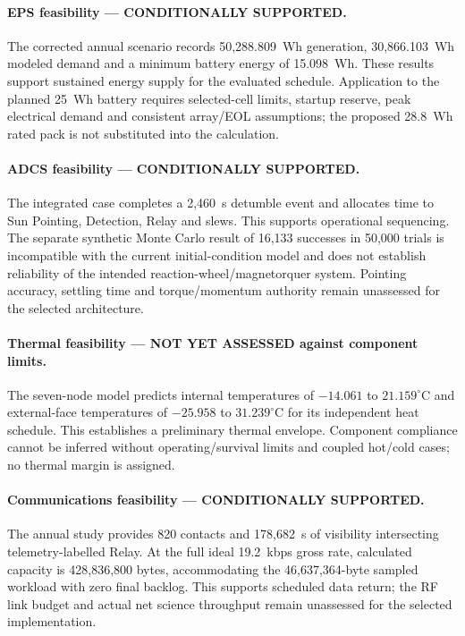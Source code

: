 \paragraph{EPS feasibility --- CONDITIONALLY SUPPORTED.}
The corrected annual scenario records 50,288.809~Wh generation, 30,866.103~Wh modeled demand and a minimum battery energy of 15.098~Wh. These results support sustained energy supply for the evaluated schedule. Application to the planned 25~Wh battery requires selected-cell limits, startup reserve, peak electrical demand and consistent array/EOL assumptions; the proposed 28.8~Wh rated pack is not substituted into the calculation.

\paragraph{ADCS feasibility --- CONDITIONALLY SUPPORTED.}
The integrated case completes a 2,460~s detumble event and allocates time to Sun Pointing, Detection, Relay and slews. This supports operational sequencing. The separate synthetic Monte Carlo result of 16,133 successes in 50,000 trials is incompatible with the current initial-condition model and does not establish reliability of the intended reaction-wheel/magnetorquer system. Pointing accuracy, settling time and torque/momentum authority remain unassessed for the selected architecture.

\paragraph{Thermal feasibility --- NOT YET ASSESSED against component limits.}
The seven-node model predicts internal temperatures of $-14.061$ to $21.159^\circ$C and external-face temperatures of $-25.958$ to $31.239^\circ$C for its independent heat schedule. This establishes a preliminary thermal envelope. Component compliance cannot be inferred without operating/survival limits and coupled hot/cold cases; no thermal margin is assigned.

\paragraph{Communications feasibility --- CONDITIONALLY SUPPORTED.}
The annual study provides 820 contacts and 178,682~s of visibility intersecting telemetry-labelled Relay. At the full ideal 19.2~kbps gross rate, calculated capacity is 428,836,800 bytes, accommodating the 46,637,364-byte sampled workload with zero final backlog. This supports scheduled data return; the RF link budget and actual net science throughput remain unassessed for the selected implementation.

